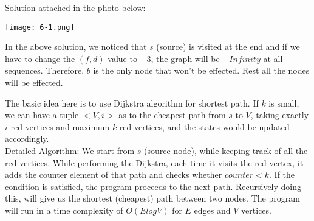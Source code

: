 \documentclass[12pt,twoside]{article}
\begin{document}


\begin{problems}

\problem  %

\begin{problemparts}
\problempart %
Solution attached in the photo below:
\begin{center}
  \texttt{[image: 6-1.png]}
\end{center}
\problempart %
In the above solution, we noticed that $s$ (source) is visited at the end and if we have to change the $(f, d)$ value to $-3$, the graph will be $-Infinity$ at all sequences. Therefore, $b$ is the only node that won't be effected. Rest all the nodes will be effected. 
\end{problemparts}

\newpage
\problem  %

\begin{problemparts}
\problempart %
The basic idea here is to use Dijkstra algorithm for shortest path. If $k$ is small, we can have a tuple $<V, i>$ as to the cheapest path from $s$ to $V$, taking exactly $i$ red vertices and maximum $k$ red vertices, and the states would be updated accordingly.  \\
Detailed Algorithm: We start from $s$ (source node), while keeping track of all the red vertices. While performing the Dijkstra, each time it visits the red vertex, it adds the counter element of that path and checks whether $counter < k$. If the condition is satisfied, the program proceeds to the next path. Recursively doing this, will give us the shortest (cheapest) path between two nodes. The program will run in a time complexity of $O(ElogV)$ for $E$ edges and $V$ vertices.  

\end{problemparts}

\newpage
\problem  %


\end{problems}
\end{document}

